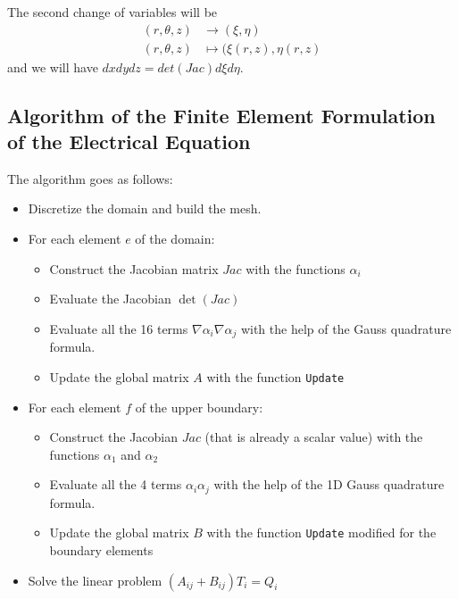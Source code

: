 The second change of variables will be 
\begin{align}\label{change3}
(r,\theta,z)&\to(\xi,\eta)\\
(r,\theta,z)&\mapsto(\xi(r,z),\eta(r,z)\nonumber
\end{align}
and we will have $ dxdydz=det(Jac)d\xi d\eta $.
\subsection{Algorithm of the Finite Element Formulation of the Electrical Equation}
\begin{mdframed}
	The algorithm goes as follows:
	\begin{itemize}
		\item Discretize the domain and build the mesh.
		\item For each element $ e $ of the domain:
		\begin{itemize}
			\item Construct the Jacobian matrix $ Jac $ with the functions $ \alpha_i $
			\item Evaluate the Jacobian $ \det(Jac) $
			\item Evaluate all the 16 terms $ \nabla\alpha_i\nabla\alpha_j $ with the help of the Gauss quadrature formula.
			\item Update the global matrix $ A $ with the function \texttt{Update}
		\end{itemize}
		\item For each element $ f $ of the upper boundary:
		\begin{itemize}
			\item Construct the Jacobian $ Jac $ (that is already a scalar value) with the functions $ \alpha_1 $ and $ \alpha_2 $
			\item Evaluate all the 4 terms $ \alpha_i\alpha_j $ with the help of the 1D Gauss quadrature formula.
			\item Update the global matrix $ B $ with the function \texttt{Update} modified for the boundary elements
		\end{itemize}
		\item Solve the linear problem $ (A_{ij}+B_{ij})T_i = Q_i $
	\end{itemize}
\end{mdframed}


